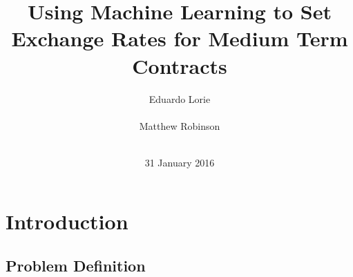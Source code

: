 \documentclass{sig-alternate-05-2015}
\begin{document}


\title{{Using Machine Learning to Set Exchange Rates for Medium Term Contracts}
}
\author{
\alignauthor
Eduardo Lorie\\
       \\
\alignauthor 
Matthew Robinson \\
       \\
}

\date{31 January 2016}

\maketitle

\section{Introduction}

\subsection{Problem Definition}
\end{document}
